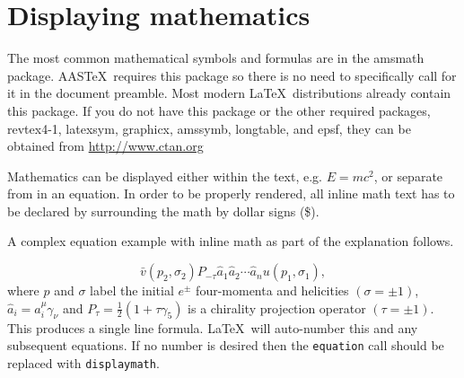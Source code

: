 \documentclass[preprint2]{aastex63}
\newcommand\aastex{AAS\TeX}
\newcommand\latex{La\TeX}
\begin{document}


\section{Displaying mathematics} \label{sec:displaymath}

The most common mathematical symbols and formulas are in the amsmath
package.  \aastex\ requires this package so there is no need to
specifically call for it in the document preamble.  Most modern \latex\
distributions already contain this package.  If you do not have this
package or the other required packages, revtex4-1, latexsym, graphicx,
amssymb, longtable, and epsf, they can be obtained from 
\url{http://www.ctan.org}

Mathematics can be displayed either within the text, e.g. $E = mc^2$, or
separate from in an equation.  In order to be properly rendered, all inline
math text has to be declared by surrounding the math by dollar signs (\$).

A complex equation example with inline math as part of the explanation
follows.

\begin{equation}
\bar v(p_2,\sigma_2)P_{-\tau}\hat a_1\hat a_2\cdots
\hat a_nu(p_1,\sigma_1) ,
\end{equation}
where $p$ and $\sigma$ label the initial $e^{\pm}$ four-momenta
and helicities $(\sigma = \pm 1)$, $\hat a_i=a^\mu_i\gamma_\nu$
and $P_\tau=\frac{1}{2}(1+\tau\gamma_5)$ is a chirality projection
operator $(\tau = \pm1)$.  This produces a single line formula.  \latex\ will
auto-number this and any subsequent equations.  If no number is desired then
the {\tt\string equation} call should be replaced with {\tt\string displaymath}.
\end{document}
